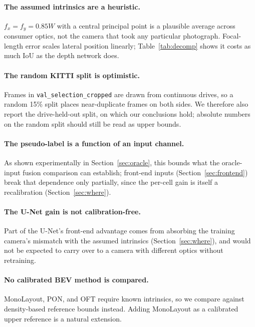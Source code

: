 \documentclass[sigconf]{acmart}
\newcommand{\rev}[1]{{\color{revcolor}#1}}
\newenvironment{revised}{\color{revcolor}}{}
\begin{document}
\paragraph{The assumed intrinsics are a heuristic.} $f_x = f_y = 0.85W$ with a central principal point is a plausible average across consumer optics, not the camera that took any particular photograph. Focal-length error scales lateral position linearly\rev{; Table~\ref{tab:decomp} shows it costs as much IoU as the depth network does}.

\paragraph{\rev{The random KITTI split is optimistic.}} Frames in \texttt{val\_\allowbreak selection\_\allowbreak cropped} are drawn from continuous drives, so a random 15\% split places near-duplicate frames on both sides. \rev{We therefore also report the drive-held-out split, on which our conclusions hold; absolute numbers on the random split should still be read as upper bounds.}

\paragraph{The pseudo-label is a function of an input channel.} As \rev{shown experimentally} in Section~\ref{sec:oracle}, this bounds what the oracle-input fusion comparison can establish\rev{; front-end inputs (Section~\ref{sec:frontend}) break that dependence only partially, since the per-cell gain is itself a recalibration (Section~\ref{sec:where})}.

\begin{revised}
\paragraph{The U-Net gain is not calibration-free.} Part of the U-Net's front-end advantage comes from absorbing the training camera's mismatch with the assumed intrinsics (Section~\ref{sec:where}), and would not be expected to carry over to a camera with different optics without retraining.

\paragraph{No calibrated BEV method is compared.} MonoLayout, PON, and OFT require known intrinsics, so we compare against density-based reference bounds instead. Adding MonoLayout as a calibrated upper reference is a natural extension.
\end{revised}
\end{document}
